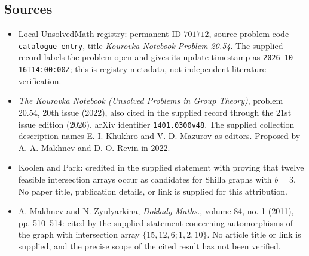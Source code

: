 \documentclass[11pt]{article}
\begin{document}
\subsection{Sources}
\begin{itemize}
\item Local UnsolvedMath registry: permanent ID \(701712\), source problem code \texttt{catalogue entry}, title \emph{Kourovka Notebook Problem 20.54}. The supplied record labels the problem open and gives its update timestamp as \texttt{2026-10-16T14:00:00Z}; this is registry metadata, not independent literature verification.
\item \emph{The Kourovka Notebook (Unsolved Problems in Group Theory)}, problem 20.54, 20th issue (2022), also cited in the supplied record through the 21st issue edition (2026), arXiv identifier \texttt{1401.0300v48}. The supplied collection description names E. I. Khukhro and V. D. Mazurov as editors. Proposed by A. A. Makhnev and D. O. Revin in 2022.
\item Koolen and Park: credited in the supplied statement with proving that twelve feasible intersection arrays occur as candidates for Shilla graphs with \(b=3\). No paper title, publication details, or link is supplied for this attribution.
\item A. Makhnev and N. Zyulyarkina, \emph{Doklady Maths.}, volume 84, no. 1 (2011), pp. 510--514: cited by the supplied statement concerning automorphisms of the graph with intersection array \(\{15,12,6;1,2,10\}\). No article title or link is supplied, and the precise scope of the cited result has not been verified.
\end{itemize}
\end{document}
